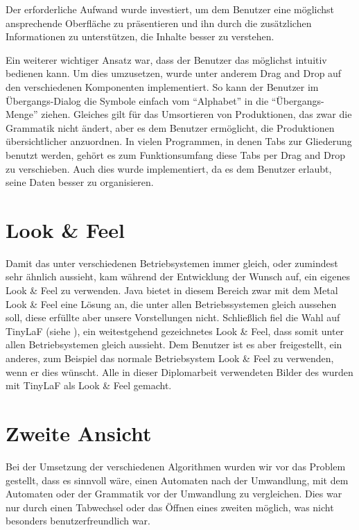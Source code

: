 Der erforderliche Aufwand wurde investiert, um dem Benutzer eine möglichst
ansprechende Oberfläche zu präsentieren und ihn durch die zusätzlichen
Informationen zu unterstützen, die Inhalte besser zu verstehen.\vspace{10pt}

Ein weiterer wichtiger Ansatz war, dass der Benutzer das \gtitool möglichst
intuitiv bedienen kann. Um dies umzusetzen, wurde unter anderem Drag and Drop
auf den verschiedenen Komponenten implementiert. So kann der Benutzer im
Übergangs-Dialog die Symbole einfach vom "`Alphabet"' in die
"`Übergangs-Menge"' ziehen. Gleiches gilt für das Umsortieren von Produktionen,
das zwar die Grammatik nicht ändert, aber es dem Benutzer ermöglicht, die
Produktionen übersichtlicher anzuordnen. In vielen Programmen, in denen Tabs
zur Gliederung benutzt werden, gehört es zum Funktionsumfang diese Tabs per Drag
and Drop zu verschieben. Auch dies wurde implementiert, da es dem Benutzer
erlaubt, seine Daten besser zu organisieren.\vspace{10pt}


\section{Look \& Feel}\label{LookAndFeel}

Damit das \gtitool unter verschiedenen Betriebsystemen immer gleich, oder
zumindest sehr ähnlich aussieht, kam während der Entwicklung der Wunsch auf, ein
eigenes Look \& Feel zu verwenden. Java bietet in diesem Bereich zwar mit dem
Metal Look \& Feel eine Lösung an, die unter allen Betriebssystemen gleich
aussehen soll, diese erfüllte aber unsere Vorstellungen nicht. Schließlich fiel
die Wahl auf TinyLaF (siehe \cite{tinylaf}), ein weitestgehend gezeichnetes
Look \& Feel, dass somit unter allen Betriebsystemen gleich aussieht. Dem
Benutzer ist es aber freigestellt, ein anderes, zum Beispiel das normale
Betriebsystem Look \& Feel zu verwenden, wenn er dies wünscht. Alle in dieser
Diplomarbeit verwendeten Bilder des \gtitools wurden mit TinyLaF als Look \&
Feel gemacht.\vspace{10pt}


\section{Zweite Ansicht}\label{SecondView}

Bei der Umsetzung der verschiedenen Algorithmen wurden wir vor das Problem
gestellt, dass es sinnvoll wäre, einen Automaten nach der Umwandlung, mit dem
Automaten oder der Grammatik vor der Umwandlung zu vergleichen. Dies war nur
durch einen Tabwechsel oder das Öffnen eines zweiten \gtitools möglich, was
nicht besonders benutzerfreundlich war.\vspace{10pt}

